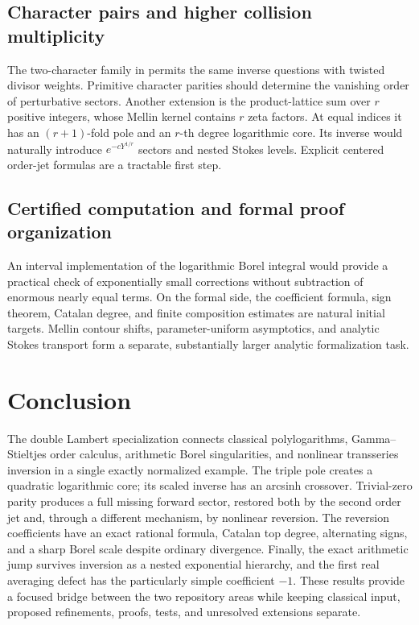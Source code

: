 \documentclass[11pt,a4paper]{article}
\numberwithin{equation}{section}
\theoremstyle{definition}\newtheorem{definition}[theorem]{Definition}
\theoremstyle{remark}\newtheorem{remark}[theorem]{Remark}
\begin{document}
\subsection{Character pairs and higher collision multiplicity}
The two-character family in \cite{BD2025} permits the same inverse
questions with twisted divisor weights. Primitive character parities
should determine the vanishing order of perturbative sectors. Another
extension is the product-lattice sum over $r$ positive integers, whose
Mellin kernel contains $r$ zeta factors. At equal indices it has an
$(r+1)$-fold pole and an $r$-th degree logarithmic core. Its inverse
would naturally introduce $e^{-cY^{1/r}}$ sectors and nested Stokes
levels. Explicit centered order-jet formulas are a tractable first step.

\subsection{Certified computation and formal proof organization}
An interval implementation of the logarithmic Borel integral would
provide a practical check of exponentially small corrections without
subtraction of enormous nearly equal terms. On the formal side, the
coefficient formula, sign theorem, Catalan degree, and finite
composition estimates are natural initial targets. Mellin contour
shifts, parameter-uniform asymptotics, and analytic Stokes transport
form a separate, substantially larger analytic formalization task.

\section*{Conclusion}
The double Lambert specialization connects classical polylogarithms,
Gamma--Stieltjes order calculus, arithmetic Borel singularities, and
nonlinear transseries inversion in a single exactly normalized example.
The triple pole creates a quadratic logarithmic core; its scaled inverse
has an arcsinh crossover. Trivial-zero parity produces a full missing
forward sector, restored both by the second order jet and, through a
different mechanism, by nonlinear reversion. The reversion coefficients
have an exact rational formula, Catalan top degree, alternating signs,
and a sharp Borel scale despite ordinary divergence. Finally, the exact
arithmetic jump survives inversion as a nested exponential hierarchy,
and the first real averaging defect has the particularly simple
coefficient $-1$. These results provide a focused bridge between the
two repository areas while keeping classical input, proposed refinements,
proofs, tests, and unresolved extensions separate.
\end{document}
